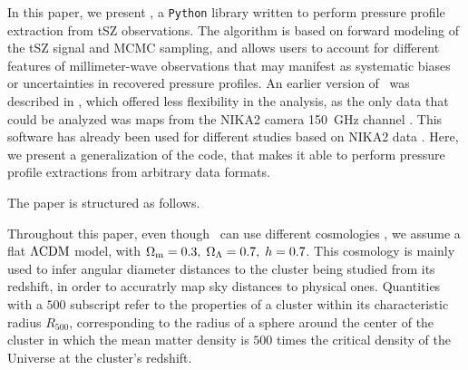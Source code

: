 In this paper, we present \panco, a \texttt{Python} library written to perform pressure profile extraction from tSZ observations.
The algorithm is based on forward modeling of the tSZ signal and MCMC sampling, and allows users to account for different features of millimeter-wave observations that may manifest as systematic biases or uncertainties in recovered pressure profiles.
An earlier version of \panco\ was described in \citet{keruzore_panco2_2021}, which offered less flexibility in the analysis, as the only data that could be analyzed was maps from the NIKA2 camera 150~GHz channel \citep{adam_nika2_2018, perotto_calibration_2020}.
This software has already been used for different studies based on NIKA2 data \citep[\eg][]{artis_psz2_2022,munoz-echeverria_multi-probe_2022,munoz-echeverria_lpsz-clash_2022}.
Here, we present a generalization of the code, that makes it able to perform pressure profile extractions from arbitrary data formats.

The paper is structured as follows.
\textcolor{lightgray}{\lipsum[6]}

Throughout this paper, even though \panco\ can use different cosmologies , we assume a flat $\Lambda {\rm CDM}$ model, with $\Omega_{\rm m} = 0.3, \;\Omega_\Lambda = 0.7, \; h = 0.7$.
This cosmology is mainly used to infer angular diameter distances to the cluster being studied from its redshift, in order to accuratrly map sky distances to physical ones.
Quantities with a $500$ subscript refer to the properties of a cluster within its characteristic radius $R_{500}$, corresponding to the radius of a sphere around the center of the cluster in which the mean matter density is $500$ times the critical density of the Universe at the cluster's redshift.
